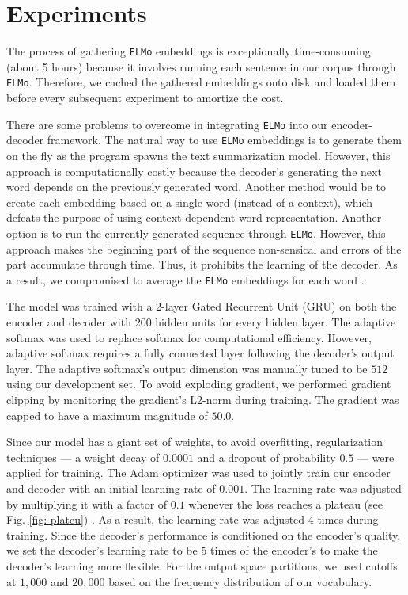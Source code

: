 \section{Experiments}
\label{sec: exp}

The process of gathering \texttt{ELMo} embeddings is exceptionally time-consuming (about 5 hours) because it involves running each sentence in our corpus through \texttt{ELMo}. Therefore, we cached the gathered embeddings onto disk and loaded them before every subsequent experiment to amortize the cost. 

There are some problems to overcome in integrating \texttt{ELMo} into our encoder-decoder framework. The natural way to use \texttt{ELMo} embeddings is to generate them on the fly as the program spawns the text summarization model. However, this approach is computationally costly because the decoder's generating the next word depends on the previously generated word. Another method would be to create each embedding based on a single word (instead of a context), which defeats the purpose of using context-dependent word representation. Another option is to run the currently generated sequence through \texttt{ELMo}. However, this approach makes the beginning part of the sequence non-sensical and errors of the part accumulate through time. Thus, it prohibits the learning of the decoder.
As a result, we compromised to average the \texttt{ELMo} embeddings for each word .

The model was trained with a 2-layer Gated Recurrent Unit (GRU) on both the encoder and decoder with $200$ hidden units for every hidden layer. The adaptive softmax was used to replace softmax for computational efficiency. However, adaptive softmax requires a fully connected layer following the decoder's output layer.  The adaptive softmax's output dimension was manually tuned to be $512$ using our development set. To avoid exploding gradient, we performed gradient clipping by monitoring the gradient's L2-norm during training. The gradient was capped to have a maximum magnitude of $50.0$.

Since our model has a giant set of weights, to avoid overfitting, regularization techniques --- a weight decay of $0.0001$ and a dropout of probability $0.5$ --- were applied for training. The Adam optimizer \cite{kingma2014adam} was used to jointly train  our encoder and decoder with an initial learning rate of $0.001$. The learning rate was adjusted by multiplying it with a factor of $0.1$ whenever the loss reaches a plateau (see Fig. \ref{fig: plateu}) . As a result, the learning rate was adjusted $4$ times during training. Since the decoder's performance is conditioned on the encoder's quality, we set the decoder's learning rate to be $5$ times of the encoder's to make the decoder's learning more flexible. For the output space partitions, we used cutoffs at $1,000$ and $20,000$ based on the frequency distribution of our vocabulary.  

